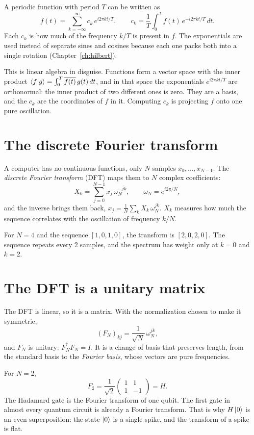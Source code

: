 A periodic function with period $T$ can be written as
\[
  f(t) = \sum_{k=-\infty}^{\infty} c_k\, e^{i 2\pi k t / T},
  \qquad
  c_k = \frac{1}{T}\int_0^T f(t)\, e^{-i 2\pi k t/T}\, dt .
\]
Each $c_k$ is how much of the frequency $k/T$ is present in $f$. The exponentials
are used instead of separate sines and cosines because each one packs both into a
single rotation (Chapter~\ref{ch:hilbert}).

This is linear algebra in disguise. Functions form a vector space with the inner
product $\braket{f|g} = \int_0^T \overline{f(t)}\, g(t)\, dt$, and in that space the
exponentials $e^{i2\pi kt/T}$ are orthonormal: the inner product of two different
ones is zero. They are a basis, and the $c_k$ are the coordinates of $f$ in it.
Computing $c_k$ is projecting $f$ onto one pure oscillation.

\section{The discrete Fourier transform}

A computer has no continuous functions, only $N$ samples $x_0, \dots, x_{N-1}$. The
\emph{discrete Fourier transform} (DFT) maps them to $N$ complex coefficients:
\[
  X_k = \sum_{j=0}^{N-1} x_j\, \omega_N^{-jk}, \qquad \omega_N = e^{i 2\pi / N},
\]
and the inverse brings them back,
$x_j = \frac1N\sum_k X_k\,\omega_N^{jk}$. $X_k$ measures how much the sequence
correlates with the oscillation of frequency $k/N$.

For $N = 4$ and the sequence $[1, 0, 1, 0]$, the transform is $[2, 0, 2, 0]$. The
sequence repeats every 2 samples, and the spectrum has weight only at $k = 0$ and
$k = 2$.

\section{The DFT is a unitary matrix}

The DFT is linear, so it is a matrix. With the normalization chosen to make it
symmetric,
\[
  (F_N)_{kj} = \frac{1}{\sqrt N}\, \omega_N^{jk},
\]
and $F_N$ is unitary: $F_N^\dagger F_N = I$. It is a change of basis that preserves
length, from the standard basis to the \emph{Fourier basis}, whose vectors are pure
frequencies.

For $N = 2$,
\[
  F_2 = \frac{1}{\sqrt2}\begin{pmatrix} 1 & 1 \\ 1 & -1 \end{pmatrix} = H .
\]
The Hadamard gate is the Fourier transform of one qubit. The first gate in almost
every quantum circuit is already a Fourier transform. That is why $H\ket0$ is an
even superposition: the state $\ket0$ is a single spike, and the transform of a
spike is flat.

